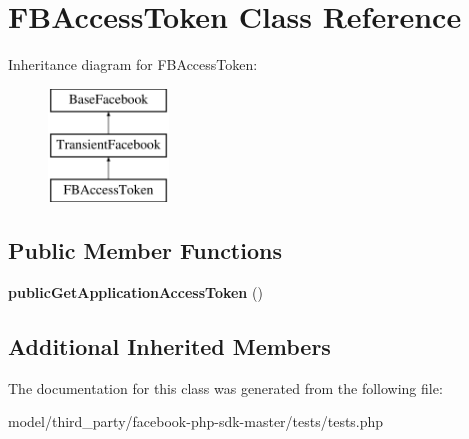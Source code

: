 \hypertarget{classFBAccessToken}{\section{F\-B\-Access\-Token Class Reference}
\label{classFBAccessToken}
}
Inheritance diagram for F\-B\-Access\-Token\-:\begin{figure}[H]
\begin{center}
\leavevmode
\includegraphics[height=3.000000cm]{classFBAccessToken}
\end{center}
\end{figure}
\subsection*{Public Member Functions}
\begin{DoxyCompactItemize}
\item 
\hypertarget{classFBAccessToken_aae04210e69a83359008775a08f2b35dc}{{\bfseries public\-Get\-Application\-Access\-Token} ()}\label{classFBAccessToken_aae04210e69a83359008775a08f2b35dc}

\end{DoxyCompactItemize}
\subsection*{Additional Inherited Members}


The documentation for this class was generated from the following file\-:\begin{DoxyCompactItemize}
\item 
model/third\-\_\-party/facebook-\/php-\/sdk-\/master/tests/tests.\-php\end{DoxyCompactItemize}
